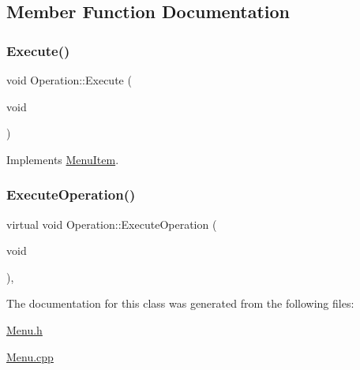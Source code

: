 \subsection{Member Function Documentation}
\mbox{\label{class_operation_a669c894cc03d476fd8acecbf880dd606}} 
\subsubsection{\texorpdfstring{Execute()}{Execute()}}
{\footnotesize\ttfamily void Operation\+::\+Execute (\begin{DoxyParamCaption}\item[{void}]{ }\end{DoxyParamCaption})\hspace{0.3cm}{\ttfamily [virtual]}}



Implements \hyperlink{class_menu_item_a08f0695dbfdad36bc9aab7597df02a00}{Menu\+Item}.

\mbox{\label{class_operation_a40ffe4a0030abaf7db98f94515ccb17e}} 
\subsubsection{\texorpdfstring{Execute\+Operation()}{ExecuteOperation()}}
{\footnotesize\ttfamily virtual void Operation\+::\+Execute\+Operation (\begin{DoxyParamCaption}\item[{void}]{ }\end{DoxyParamCaption})\hspace{0.3cm}{\ttfamily [protected]}, {}}



The documentation for this class was generated from the following files\+:\begin{DoxyCompactItemize}
\item 
\hyperlink{_menu_8h}{Menu.\+h}\item 
\hyperlink{_menu_8cpp}{Menu.\+cpp}\end{DoxyCompactItemize}
